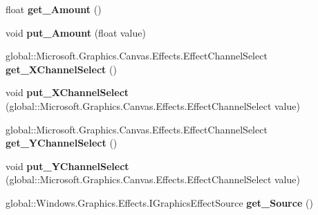 \begin{DoxyCompactItemize}
float {\bfseries get\+\_\+\+Amount} ()
\item 
\mbox{\label{class_microsoft_1_1_graphics_1_1_canvas_1_1_effects_1_1_displacement_map_effect_a778035a283ef8ab94cb70d3718c04523}} 
void {\bfseries put\+\_\+\+Amount} (float value)
\item 
\mbox{\label{class_microsoft_1_1_graphics_1_1_canvas_1_1_effects_1_1_displacement_map_effect_a9de6395612f22b140d32e3ca061cd2a5}} 
global\+::\+Microsoft.\+Graphics.\+Canvas.\+Effects.\+Effect\+Channel\+Select {\bfseries get\+\_\+\+X\+Channel\+Select} ()
\item 
\mbox{\label{class_microsoft_1_1_graphics_1_1_canvas_1_1_effects_1_1_displacement_map_effect_a17232b9afecc3a3387aba9aa88381baf}} 
void {\bfseries put\+\_\+\+X\+Channel\+Select} (global\+::\+Microsoft.\+Graphics.\+Canvas.\+Effects.\+Effect\+Channel\+Select value)
\item 
\mbox{\label{class_microsoft_1_1_graphics_1_1_canvas_1_1_effects_1_1_displacement_map_effect_a054ea7ca343451632990c0ba5745cb36}} 
global\+::\+Microsoft.\+Graphics.\+Canvas.\+Effects.\+Effect\+Channel\+Select {\bfseries get\+\_\+\+Y\+Channel\+Select} ()
\item 
\mbox{\label{class_microsoft_1_1_graphics_1_1_canvas_1_1_effects_1_1_displacement_map_effect_a16f640070ff4f567c8c7c530557b8c10}} 
void {\bfseries put\+\_\+\+Y\+Channel\+Select} (global\+::\+Microsoft.\+Graphics.\+Canvas.\+Effects.\+Effect\+Channel\+Select value)
\item 
\mbox{\label{class_microsoft_1_1_graphics_1_1_canvas_1_1_effects_1_1_displacement_map_effect_af69fbee08f58e40ff331229945a58a92}} 
global\+::\+Windows.\+Graphics.\+Effects.\+I\+Graphics\+Effect\+Source {\bfseries get\+\_\+\+Source} ()
\item 
\mbox{\label{class_microsoft_1_1_graphics_1_1_canvas_1_1_effects_1_1_displacement_map_effect_a111bf667fceee07085a750745d777c13}} 

\end{DoxyCompactItemize}
